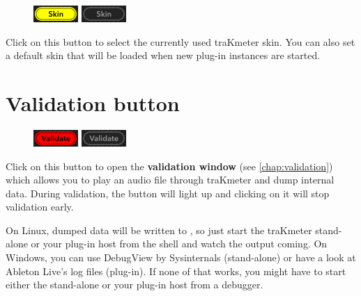 \begin{figure}
\includegraphics[scale=\screenshotscale,clip]{include/images/button_skin_on.png}
\newline \vspace{-0.9\baselineskip}
\includegraphics[scale=\screenshotscale,clip]{include/images/button_skin_off.png}
\end{figure}

Click on this button to select the currently used traKmeter skin.  You
can also set a default skin that will be loaded when new plug-in
instances are started.

\section{Validation button}
\label{sec:validation_button}

\begin{figure}
\includegraphics[scale=\screenshotscale,clip]{include/images/button_validate_on.png}
\newline \vspace{-0.9\baselineskip}
\includegraphics[scale=\screenshotscale,clip]{include/images/button_validate_off.png}
\end{figure}

Click on this button to open the \textbf{validation window} (see
\ref{chap:validation}) which allows you to play an audio file through
traKmeter and dump internal data.  During validation, the button will
light up and clicking on it will stop validation early.

On Linux, dumped data will be written to , so just start
the traKmeter stand-alone or your plug-in host from the shell and
watch the output coming.  On Windows, you can use DebugView by
Sysinternals (stand-alone) or have a look at Ableton Live's log files
(plug-in).  If none of that works, you might have to start either the
stand-alone or your plug-in host from a debugger.

